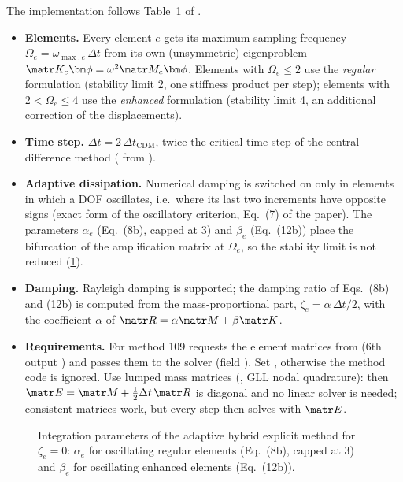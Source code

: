 The implementation follows Table~1 of \textcite{Soares2020novel}.
\begin{itemize}
  \item \textbf{Elements.} Every element $e$ gets its maximum sampling frequency
    $\Omega_e = \omega_{\max,e}\,\Delta t$ from its own (unsymmetric)
    eigenproblem $\matr K_e\bm\phi = \omega^2\matr M_e\bm\phi$. Elements with
    $\Omega_e \le 2$ use the \emph{regular} formulation (stability limit 2, one
    stiffness product per step); elements with $2 < \Omega_e \le 4$ use the
    \emph{enhanced} formulation (stability limit 4, an additional correction of
    the displacements).
  \item \textbf{Time step.} $\Delta t = 2\,\Delta t_\mathrm{CDM}$, twice the
    critical time step of the central difference method ( from
    ).
  \item \textbf{Adaptive dissipation.} Numerical damping is switched on only in
    elements in which a DOF oscillates, i.e.\ where its last two increments have
    opposite signs (exact form of the oscillatory criterion, Eq.~(7) of the
    paper). The parameters $\alpha_e$ (Eq.~(8b), capped at 3) and $\beta_e$
    (Eq.~(12b)) place the bifurcation of the amplification matrix at $\Omega_e$,
    so the stability limit is not reduced (\cref{fig:ahem}).
  \item \textbf{Damping.} Rayleigh damping is supported; the damping ratio of
    Eqs.~(8b) and (12b) is computed from the mass-proportional part,
    $\zeta_e = \alpha\,\Delta t/2$, with the coefficient $\alpha$ of
    $\matr R = \alpha\matr M + \beta\matr K$.
  \item \textbf{Requirements.} For method 109  requests
    the element matrices from  (6th output ) and
    passes them to the solver (field ). Set
    , otherwise the method code is ignored. Use lumped
    mass matrices (, GLL nodal quadrature): then
    $\matr E = \matr M + \tfrac12\Delta t\,\matr R$ is diagonal and no linear
    solver is needed; consistent matrices work, but every step then solves with
    $\matr E$.
\end{itemize}

\begin{figure}[htbp]
  \centering
  
  \caption{Integration parameters of the adaptive hybrid explicit method for
    $\zeta_e = 0$: $\alpha_e$ for oscillating regular elements (Eq.~(8b),
    capped at 3) and $\beta_e$ for oscillating enhanced elements (Eq.~(12b)).}
  \label{fig:ahem}
\end{figure}

